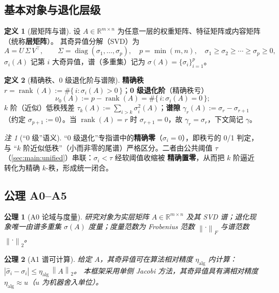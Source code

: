 \documentclass[UTF8,11pt,a4paper]{ctexart}
\theoremstyle{plain}
\newtheorem{axiom}{公理}
\theoremstyle{definition}
\newtheorem{definition}{定义}
\theoremstyle{remark}
\newtheorem{remark}{注}
\newcommand{\R}{\mathbb{R}}
\newcommand{\rank}{\operatorname{rank}}
\newcommand{\diag}{\operatorname{diag}}
\newcommand{\Fnorm}[1]{\left\lVert #1\right\rVert_F}
\newcommand{\Tnorm}[1]{\left\lVert #1\right\rVert_2}
\begin{document}
\subsection{基本对象与退化层级}

\begin{definition}[层矩阵与谱]\label{def:matrix}
设 $A\in\R^{m\times n}$ 为任意一层的权重矩阵、特征矩阵或内容矩阵（统称\textbf{层矩阵}）。
其奇异值分解（SVD）为
\[
A=U\,\Sigma\,V^\top,\qquad
\Sigma=\diag(\sigma_1,\dots,\sigma_p),\quad p=\min(m,n),\quad
\sigma_1\ge\sigma_2\ge\cdots\ge\sigma_p\ge0,
\]
$\sigma_i(A)$ 记第 $i$ 大奇异值，谱（多重集）记为 $\sigma(A)=\{\sigma_i\}_{i=1}^{p}$。
\end{definition}

\begin{definition}[精确秩、0 级退化阶与谱隙]\label{def:rank}
\textbf{精确秩} $r=\rank(A):=\#\{\,i:\sigma_i(A)>0\,\}$；\textbf{0 级退化阶}（精确秩亏）
\[
\nu_0(A):=p-\rank(A)=\#\{\,i:\sigma_i(A)=0\,\};
\]
$k$ 阶（近似）低秩残差 $\tau_k(A):=\sum_{i>k}\sigma_i^2(A)$；\textbf{谱隙}
$\gamma_r(A):=\sigma_r-\sigma_{r+1}$（约定 $\sigma_{p+1}:=0$）。当 $\rank(A)=r$ 时
$\sigma_{r+1}=0$，故 $\gamma_r=\sigma_r$，下文简记 $\gamma$。
\end{definition}

\begin{remark}[“0 级”语义]\label{rem:zerolevel}
“0 级退化”专指谱中的\textbf{精确零}（$\sigma_i=0$），即秩亏的 0/1 判定，与
“$k$ 阶近似低秩”（小而非零的尾谱）严格区分。二者由公共阈值 $\tau$
（\textsection\ref{sec:main:unified}）串联：$\sigma_i<\tau$ 经软阈值收缩被
\textbf{精确置零}，从而把 $k$ 阶逼近转化为精确 $k$-秩，形成统一闭合。
\end{remark}

\subsection{公理 A0--A5}

\begin{axiom}[A0 论域与度量]\label{ax:A0}
研究对象为实层矩阵 $A\in\R^{m\times n}$ 及其 SVD 谱；退化现象唯一由谱多重集
$\sigma(A)$ 度量；度量范数为 Frobenius 范数 $\Fnorm{\cdot}$ 与谱范数 $\Tnorm{\cdot}$。
\end{axiom}

\begin{axiom}[A1 谱可计算]\label{ax:A1}
给定 $A$，其奇异值可在算法相对精度 $\eta_{\mathrm{alg}}$ 内计算：
$|\hat\sigma_i-\sigma_i|\le\eta_{\mathrm{alg}}\,\Tnorm{A}$。
本框架采用单侧 Jacobi 方法，其奇异值具有满相对精度
$\eta_{\mathrm{alg}}\approx u$（$u$ 为机器舍入单位）\cite{demmel1992,higham2002}。
\end{axiom}
\end{document}

